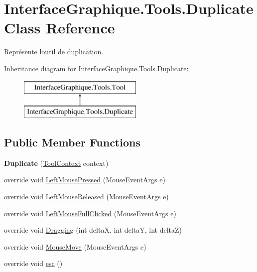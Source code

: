 \hypertarget{class_interface_graphique_1_1_tools_1_1_duplicate}{}\section{Interface\+Graphique.\+Tools.\+Duplicate Class Reference}
\label{class_interface_graphique_1_1_tools_1_1_duplicate}


Représente l\textquotesingle{}outil de duplication.  


Inheritance diagram for Interface\+Graphique.\+Tools.\+Duplicate\+:\begin{figure}[H]
\begin{center}
\leavevmode
\includegraphics[height=2.000000cm]{class_interface_graphique_1_1_tools_1_1_duplicate}
\end{center}
\end{figure}
\subsection*{Public Member Functions}
\begin{DoxyCompactItemize}
\item 
\hypertarget{class_interface_graphique_1_1_tools_1_1_duplicate_a5cfcc7ce5a31490ee9347ce121c9c7c4}{}{\bfseries Duplicate} (\hyperlink{class_interface_graphique_1_1_tools_1_1_tool_context}{Tool\+Context} context)\label{class_interface_graphique_1_1_tools_1_1_duplicate_a5cfcc7ce5a31490ee9347ce121c9c7c4}

\item 
override void \hyperlink{class_interface_graphique_1_1_tools_1_1_duplicate_ab3771a3f6ead534124feaf89f542a910}{Left\+Mouse\+Pressed} (Mouse\+Event\+Args e)
\item 
override void \hyperlink{class_interface_graphique_1_1_tools_1_1_duplicate_a23482008d3d07f80d4b5b9db77fd63c9}{Left\+Mouse\+Released} (Mouse\+Event\+Args e)
\item 
override void \hyperlink{class_interface_graphique_1_1_tools_1_1_duplicate_a55a29f559ad9051390f107b34cd667a6}{Left\+Mouse\+Full\+Clicked} (Mouse\+Event\+Args e)
\item 
override void \hyperlink{class_interface_graphique_1_1_tools_1_1_duplicate_a92888a92cbdd84f7c617b82dde014c0f}{Dragging} (int delta\+X, int delta\+Y, int delta\+Z)
\item 
override void \hyperlink{class_interface_graphique_1_1_tools_1_1_duplicate_aa8bb7b1bf21dceacd60ac1a502c31a40}{Mouse\+Move} (Mouse\+Event\+Args e)
\item 
override void \hyperlink{class_interface_graphique_1_1_tools_1_1_duplicate_a52769869afe558c10ec13bbc54d896f3}{esc} ()
\end{DoxyCompactItemize}


